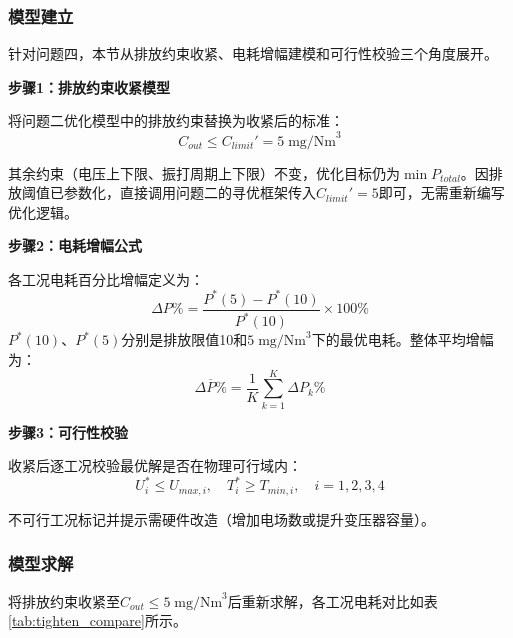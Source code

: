 
\subsubsection{模型建立}

针对问题四，本节从排放约束收紧、电耗增幅建模和可行性校验三个角度展开。

\textbf{步骤1：排放约束收紧模型}

将问题二优化模型中的排放约束替换为收紧后的标准：
\begin{equation}
    C_{out} \leq C_{limit}' = 5\;\text{mg/Nm}^3
\end{equation}

其余约束（电压上下限、振打周期上下限）不变，优化目标仍为$\min P_{total}$。因排放阈值已参数化，直接调用问题二的寻优框架传入$C_{limit}'=5$即可，无需重新编写优化逻辑。

\textbf{步骤2：电耗增幅公式}

各工况电耗百分比增幅定义为：
\begin{equation}
    \Delta P\% = \frac{P^*(5) - P^*(10)}{P^*(10)} \times 100\%
\end{equation}
$P^*(10)$、$P^*(5)$分别是排放限值10和$5\;\text{mg/Nm}^3$下的最优电耗。整体平均增幅为：
\begin{equation}
    \overline{\Delta P\%} = \frac{1}{K}\sum_{k=1}^{K}\Delta P_k\%
\end{equation}

\textbf{步骤3：可行性校验}

收紧后逐工况校验最优解是否在物理可行域内：
\begin{equation}
    U_i^* \leq U_{max,i},\quad T_i^* \geq T_{min,i},\quad i=1,2,3,4
\end{equation}

不可行工况标记并提示需硬件改造（增加电场数或提升变压器容量）。

\subsubsection{模型求解}

将排放约束收紧至$C_{out}\leq 5\;\text{mg/Nm}^3$后重新求解，各工况电耗对比如表\ref{tab:tighten_compare}所示。

